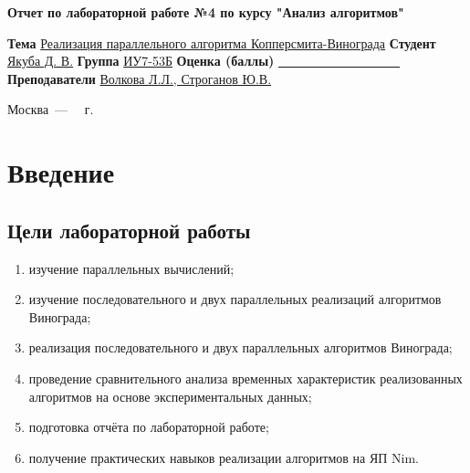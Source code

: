 \documentclass[12pt]{report}
\begin{document}
\begin{titlepage}
	
	\begin{center}
		\Large\textbf{Отчет по лабораторной работе №4 по курсу "Анализ алгоритмов"}\newline
	\end{center}
	
	\noindent\textbf{Тема} \underline{Реализация параллельного алгоритма Копперсмита-Винограда}\newline\newline\newline
	\noindent\textbf{Студент} \underline{Якуба Д. В.}\newline\newline
	\noindent\textbf{Группа} \underline{ИУ7-53Б}\newline\newline
	\noindent\textbf{Оценка (баллы)} \underline{~~~~~~~~~~~~~~~~~~~}\newline\newline
	\noindent\textbf{Преподаватели} \underline{Волкова Л.Л., Строганов Ю.В.}\newline
	
	\begin{center}
		\vfill
		Москва~---~\the\year
		~г.
	\end{center}
\end{titlepage}

\tableofcontents

\newpage
\chapter*{Введение}
\section*{Цели лабораторной работы}
\begin{enumerate}
\item изучение параллельных вычислений;
\item изучение последовательного и двух параллельных реализаций алгоритмов Винограда;
\item реализация последовательного и двух параллельных алгоритмов Винограда;
\item проведение сравнительного анализа временных характеристик реализованных алгоритмов на основе экспериментальных данных;
\item подготовка отчёта по лабораторной работе;
\item получение практических навыков реализации алгоритмов на ЯП Nim.
\end{enumerate}
\end{document}
